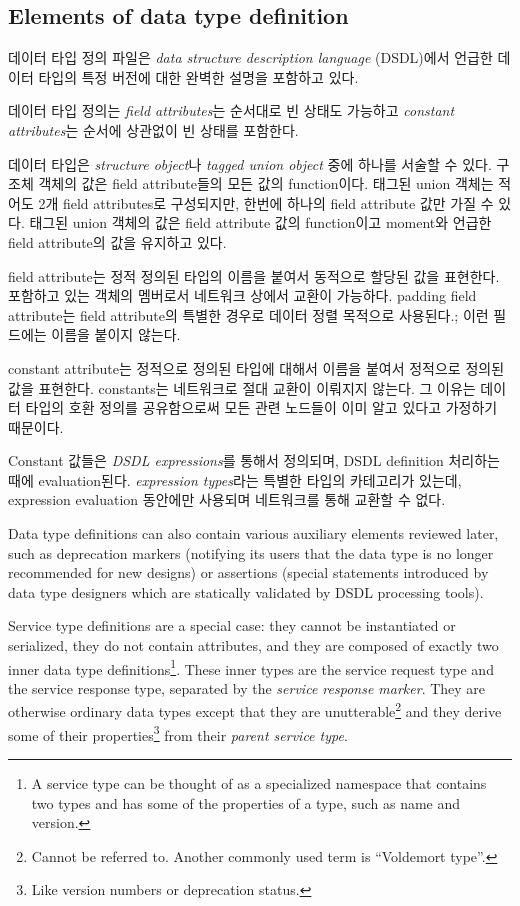 \subsection{Elements of data type definition}\label{sec:dsdl_elements_of_data_type_definition}

데이터 타입 정의 파일은 \emph{data structure description language} (DSDL)에서 언급한 데이터 타입의 특정 버전에 대한 완벽한 설명을 포함하고 있다.

데이터 타입 정의는 \emph{field attributes}는 순서대로 빈 상태도 가능하고 \emph{constant attributes}는 순서에 상관없이 빈 상태를 포함한다.

데이터 타입은 \emph{structure object}나 \emph{tagged union object} 중에 하나를 서술할 수 있다.
구조체 객체의 값은 field attribute들의 모든 값의 function이다.
태그된 union 객체는 적어도 2개 field attributes로 구성되지만,
한번에 하나의 field attribute 값만 가질 수 있다.
태그된 union 객체의 값은 field attribute 값의 function이고 moment와 언급한 field attribute의 값을 유지하고 있다.

field attribute는 정적 정의된 타입의 이름을 붙여서 동적으로 할당된 값을 표현한다. 포함하고 있는 객체의 멤버로서 네트워크 상에서 교환이 가능하다.
padding field attribute는 field attribute의 특별한 경우로 데이터 정렬 목적으로 사용된다.;
이런 필드에는 이름을 붙이지 않는다.

constant attribute는 정적으로 정의된 타입에 대해서 이름을 붙여서 정적으로 정의된 값을 표현한다.
constants는 네트워크로 절대 교환이 이뤄지지 않는다. 그 이유는 데이터 타입의 호환 정의를 공유함으로써 모든 관련 노드들이 이미 알고 있다고 가정하기 때문이다.

Constant 값들은 \emph{DSDL expressions}를 통해서 정의되며,
DSDL definition 처리하는 때에 evaluation된다.
\emph{expression types}라는 특별한 타입의 카테고리가 있는데,
expression evaluation 동안에만 사용되며 네트워크를 통해 교환할 수 없다.


Data type definitions can also contain various auxiliary elements reviewed later,
such as deprecation markers (notifying its users that the data type is no longer recommended for new designs)
or assertions (special statements introduced by data type designers
which are statically validated by DSDL processing tools).

Service type definitions are a special case:
they cannot be instantiated or serialized, they do not contain attributes,
and they are composed of exactly two inner data type definitions\footnote{
    A service type can be thought of as a specialized namespace that contains two types and
    has some of the properties of a type, such as name and version.
}.
These inner types are the service request type and the service response type,
separated by the \emph{service response marker}.
They are otherwise ordinary data types except that they are unutterable\footnote{%
    Cannot be referred to. Another commonly used term is ``Voldemort type''.
}
and they derive some of their properties\footnote{Like version numbers or deprecation status.}
from their \emph{parent service type}.

